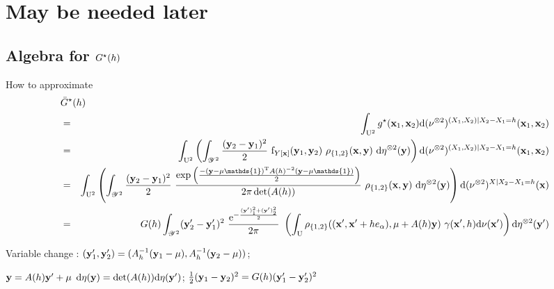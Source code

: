 
\section{May be needed later}

\subsection{Algebra for $G^\star(h)$}
How to approximate 
\begin{eqnarray}
\lefteqn{
\bar\Semivariogram^\star(h)}\\
&=&\int_{\Pop^2} g^\star(\position_1,\position_2) \derive(\dominantU^{\otimes 2})^{(X_1,X_2)\mid X_2-X_1=h}(\position_1,\position_2)\\
&=&\int_{\Pop^2} \left(\int_{\range{\Signal}^2} \frac{(\signal_2-\signal_1)^2}{2}~ \density_{\Signal[\position]}(\signal_1,\signal_2)~
\rho_{\{1,2\}}(\position,\signal)~
\derive\dominantY^{\otimes 2}(\signal) \right) \derive(\dominantU^{\otimes 2})^{(X_1,X_2)\mid X_2-X_1=h}(\position_1,\position_2)\\
&=&
\int_{\Pop^2} \left(
\int_{\range{\Signal}^2} \frac{(\signal_2-\signal_1)^2}{2}~
\frac{
\exp\left(\frac{-(\signal-\mu\mathds{1})^{\mathrm{T}}A(h)^{-2}(\signal-\mu\mathds{1})}2\right)}{2\pi
\det(A(h))}~
\rho_{\{1,2\}}(\position,\signal)~
\derive\dominantY^{\otimes 2}(\signal) \right) \derive(\dominantU^{\otimes 2})^{X\mid X_2-X_1=h}(\position)\\
&=&
\Semivariogram(h)
\int_{\range{\Signal}^2} 
(\signal'_2-\signal'_1)^2~ \frac{\mathrm{e}^{-\frac{(\signal')_1^2+(\signal')_2^2}{2}}}{2\pi}~
\left(\int_{\Pop}
\rho_{\{1,2\}}((\position',\position'+h e_\alpha),\mu+A(h)\signal)~
\gamma(\position',h)
\derive\dominantU(\position')\right)
\derive\dominantY^{\otimes 2}(\signal') 
\end{eqnarray}

Variable change : $(\mathbf{y}'_1,\mathbf{y}'_2)=
(A_h^{-1}(\mathbf{y}_1-\mu),
 A_h^{-1}(\mathbf{y}_2-\mu))$;
 
 $\mathbf{y}=A(h)\mathbf{y}'+\mu$
$\mathrm{d}\eta(\mathbf{y})=\det(A(h))\mathrm{d}\eta(\mathbf{y}')$;
$\frac12(\mathbf{y}_1-\mathbf{y}_2)^2=G(h)(\mathbf{y}'_1-\mathbf{y}'_2)^2$

